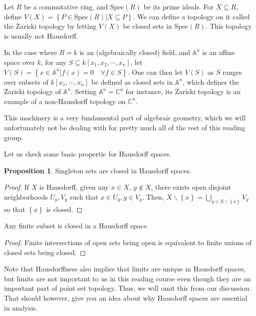 \documentclass[12pt,reqno]{amsart}
\numberwithin{theorem}{section}
\theoremstyle{definition}
\theoremstyle{remark}
\numberwithin{equation}{section}
\newcommand{\set}[1]{\left \{ #1 \right \}}
\theoremstyle{definition}
\newtheorem{prop}[theorem]{Proposition}
\begin{document}
\begin{example}
    Let $R$ be a commutative ring, and $\mathrm{Spec}(R)$ be its prime ideals. For $X \subseteq R$, define $V(X) = \set{P \in \mathrm{Spec}(R) | X \subseteq P}$. We can define a topology on it called the Zariski topology by letting $V(X)$ be closed sets in $\mathrm{Spec}(R)$. This topology is usually not Hausdorff. 

    In the case where $R=k$ is an (algebraically closed) field, and $\mathbb A^n$ is an affine space over $k$, for any $S \subseteq k[x_1,x_2,\cdots,x_n]$, let $V(S) = \set{x \in \mathbb A^n| f(x) = 0 \quad \forall f \in S}$. One can then let $V(S)$ as $S$ ranges over subsets of $k[x_1,\cdots,x_n]$ be defined as closed sets in $\mathbb A^n$, which defines the Zariski topology of $\mathbb A^n$. Setting $\mathbb A^n = \mathbb C^n$ for instance, its Zariski topology is an example of a non-Hausdorff topology on $\mathbb C^n$.

    This machinery is a very fundamental part of algebraic geometry, which we will unfortunately not be dealing with for pretty much all of the rest of this reading group.
\end{example}
Let us check some basic propertie for Hausdorff spaces.
\begin{prop}
    Singleton sets are closed in Hausdorff spaces.
\end{prop}
\begin{proof}
    If $X$ is Hausdorff, given any $x \in X$, $y \notin X$, there exists open disjoint neighborhoods $U_y,V_y$ such that $x \in U_y,y \in V_y$. Then, $X\backslash \set{x} = \bigcup_{y \in X\backslash \set{x}}V_y$ so that $\set x$ is closed.
\end{proof}
\begin{corollary}
    Any finite subset is closed in a Hausdorff space.
\end{corollary}
\begin{proof}
    Finite intersections of open sets being open is equivalent to finite unions of closed sets being closed. 
\end{proof}
Note that Hausdorffness also implies that limits are unique in Hausdorff spaces, but limits are not important to us in this reading course even though they are an important part of point set topology. Thus, we will omit this from our discussion. That should however, give you an idea about why Hausdorff spaces are essential in analysis.
\end{document}
